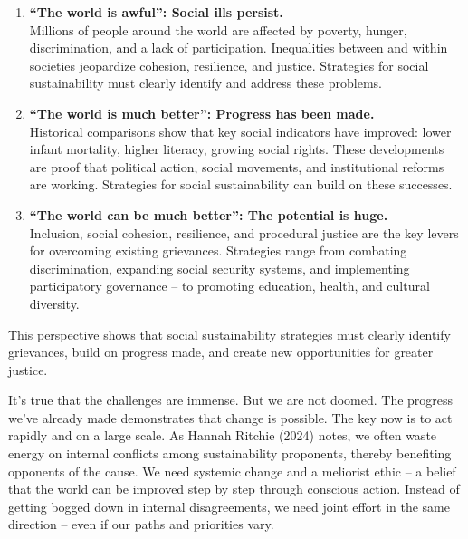\documentclass[
  a4paper,
  DIV=11,
  numbers=noendperiod,
  oneside,
  openany]{scrreprt}
\begin{document}
\begin{enumerate}
\def\labelenumi{\arabic{enumi}.}
\item
  \textbf{``The world is awful'': Social ills persist.}\\
  Millions of people around the world are affected by poverty, hunger,
  discrimination, and a lack of participation. Inequalities between and
  within societies jeopardize cohesion, resilience, and justice.
  Strategies for social sustainability must clearly identify and address
  these problems.
\item
  \textbf{``The world is much better'': Progress has been made.}\\
  Historical comparisons show that key social indicators have improved:
  lower infant mortality, higher literacy, growing social rights. These
  developments are proof that political action, social movements, and
  institutional reforms are working. Strategies for social
  sustainability can build on these successes.
\item
  \textbf{``The world can be much better'': The potential is huge.}\\
  Inclusion, social cohesion, resilience, and procedural justice are the
  key levers for overcoming existing grievances. Strategies range from
  combating discrimination, expanding social security systems, and
  implementing participatory governance -- to promoting education,
  health, and cultural diversity.
\end{enumerate}

This perspective shows that social sustainability strategies must
clearly identify grievances, build on progress made, and create new
opportunities for greater justice.

It's true that the challenges are immense. But we are not doomed. The
progress we've already made demonstrates that change is possible. The
key now is to act rapidly and on a large scale. As Hannah Ritchie (2024)
notes, we often waste energy on internal conflicts among sustainability
proponents, thereby benefiting opponents of the cause. We need systemic
change and a meliorist ethic -- a belief that the world can be improved
step by step through conscious action. Instead of getting bogged down in
internal disagreements, we need joint effort in the same direction --
even if our paths and priorities vary.
\end{document}
